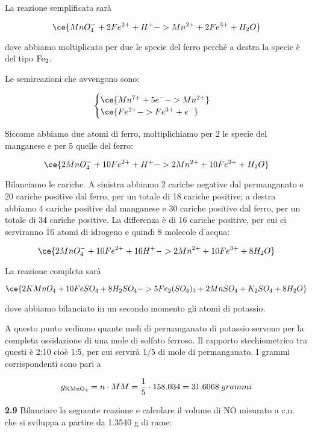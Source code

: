 La reazione semplificata sarà

$$\ce{MnO_4^- + 2Fe^{2+} + H^+ -> Mn^{2+} + 2Fe^{3+} + H_2O}$$

dove abbiamo moltiplicato per due le specie del ferro perché a destra la specie è del tipo $\rm Fe_2$.

Le semireazioni che avvengono sono:

$$\begin{cases}
    \ce{Mn^{7+} + 5e^- -> Mn^{2+}}\\
    \ce{Fe^{2+} -> Fe^{3+} + e^-}
\end{cases}$$

Siccome abbiamo due atomi di ferro, moltiplichiamo per 2 le specie del manganese e per 5 quelle del ferro:

$$\ce{2MnO_4^- + 10Fe^{2+} + H^+ -> 2Mn^{2+} + 10Fe^{3+} + H_2O}$$

Bilanciamo le cariche. A sinistra abbiamo 2 cariche negative dal permanganato e 20 cariche positive dal ferro, per un totale di 18 cariche positive; a destra abbiamo 4 cariche positive dal manganese e 30 cariche positive dal ferro, per un totale di 34 cariche positive. La differenza è di 16 cariche positive, per cui ci serviranno 16 atomi di idrogeno e quindi 8 molecole d'acqua:

$$\ce{2MnO_4^- + 10Fe^{2+} + 16H^+ -> 2Mn^{2+} + 10Fe^{3+} + 8H_2O}$$

La reazione completa sarà

$$\ce{2KMnO_4 + 10FeSO_4 + 8H_2SO_4 -> 5Fe_2(SO_4)_3 + 2MnSO_4 + K_2SO_4 + 8H_2O}$$

dove abbiamo bilanciato in un secondo momento gli atomi di potassio.

A questo punto vediamo quante moli di permanganato di potassio servono per la completa ossidazione di una mole di solfato ferroso. Il rapporto stechiometrico tra questi è 2:10 cioè 1:5, per cui servirà 1/5 di mole di permanganato. I grammi corrispondenti sono pari a

$$g_{\rm KMnO_4}=n \cdot MM=\frac{1}{5} \cdot 158.034
=31.6068\;grammi$$

\vspace{0.2cm}\textbf{2.9} Bilanciare la seguente reazione e calcolare il volume di NO misurato a c.n. che si sviluppa a
partire da 1.3540 g di rame:

\begin{center}
\end{center}

